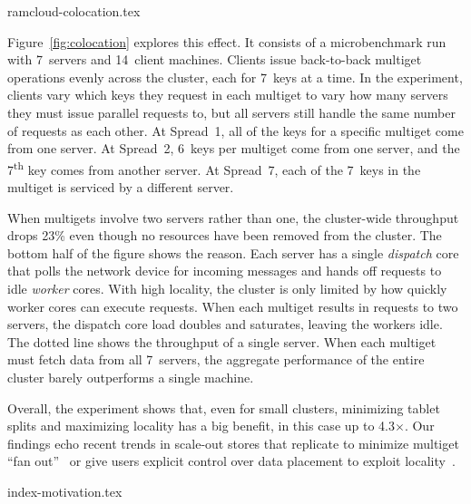  {ramcloud-colocation.tex}

Figure~\ref{fig:colocation} explores this effect. It consists of a
microbenchmark run with 7~servers and 14~client machines. Clients issue back-to-back
multiget operations evenly across the cluster, each for 7~keys at a time. In
the experiment, clients vary which keys they request in each multiget to vary
how many servers they must issue parallel requests to, but all servers still
handle the same number of requests as each other.
At Spread~1, all of the keys for a specific multiget come from one server. At
Spread~2, 6~keys per multiget come from one server, and the
7\textsuperscript{th} key comes from another server. At Spread~7, each of the
7~keys in the multiget is serviced by a different server.

When multigets involve two servers rather than one, the cluster-wide throughput
drops 23\% even though no resources have been removed from the cluster. The
bottom half of the figure shows the reason.  Each server has a single {\em dispatch}
core that polls the network device for incoming messages and hands off requests
to idle {\em worker} cores.  With high locality, the cluster is only limited by
how quickly worker cores can execute requests. When each multiget results in
requests to two servers, the dispatch core load doubles and saturates, leaving
the workers idle. The dotted line shows the throughput of a single server.
When each multiget must fetch data from all 7~servers, the aggregate
performance of the entire cluster barely outperforms a single machine.

Overall, the experiment shows that, even for small clusters, minimizing tablet
splits and maximizing locality has a big benefit, in this case up to
4.3$\times$.  Our findings echo recent trends in scale-out stores that
replicate to minimize multiget ``fan out''~\cite{fb-memcache} or give users
explicit control over data placement to exploit locality~\cite{spanner}.

 {index-motivation.tex}

